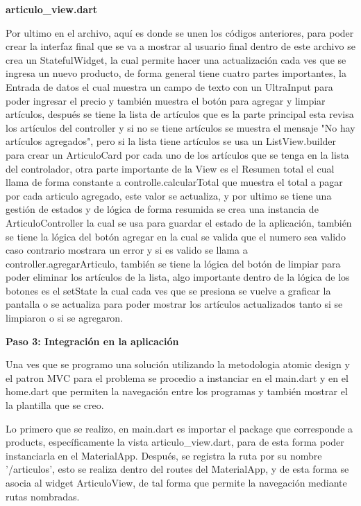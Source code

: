 \textbf{articulo\_view.dart}

Por ultimo en el archivo, aquí es donde se unen los códigos anteriores, para poder crear la interfaz final que se va a mostrar al usuario final dentro de este archivo se crea un StatefulWidget, la cual permite hacer una actualización cada ves que se ingresa un nuevo producto, de forma general tiene cuatro partes importantes, la Entrada de datos el cual muestra un campo de texto con un UltraInput para poder ingresar el precio y también muestra el botón para agregar y limpiar artículos, después se tiene la lista de artículos que es la parte principal esta revisa los artículos del controller y si no se tiene artículos se muestra el mensaje "No hay artículos agregados", pero si la lista tiene artículos se usa un ListView.builder para crear un ArticuloCard por cada uno de los artículos que se tenga en la lista del controlador, otra parte importante de la View es el Resumen total el cual llama de forma constante a controlle.calcularTotal que muestra el total a pagar por cada articulo agregado, este valor se actualiza, y por ultimo se tiene una gestión de estados y de lógica de forma resumida se crea una instancia de ArticuloController la cual se usa para guardar el estado de la aplicación, también se tiene la lógica del botón agregar en la cual se valida que el numero sea valido caso contrario mostrara un error y si es valido se llama a controller.agregarArticulo, también se tiene la lógica del botón de limpiar para poder eliminar los artículos de la lista, algo importante dentro de la lógica de los botones es el setState la cual cada ves que se presiona se vuelve a graficar la pantalla o se actualiza para poder mostrar los artículos actualizados tanto si se limpiaron o si se agregaron.


\textbf{Paso 3: Integración en la aplicación}

Una ves que se programo una solución utilizando la metodologia atomic design y el patron MVC para el problema se procedio a instanciar en el main.dart y en el home.dart que permiten la navegación entre los programas y también mostrar el la plantilla que se creo. 

Lo primero que se realizo, en main.dart es importar el package que corresponde a products, específicamente la vista articulo\_view.dart, para de esta forma poder instanciarla en el MaterialApp. Después, se registra la ruta por su nombre '/articulos', esto se realiza  dentro del routes del MaterialApp, y de esta forma se asocia al widget ArticuloView, de tal forma que permite la navegación mediante rutas nombradas.

